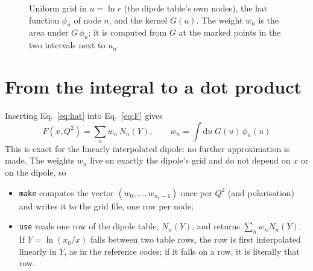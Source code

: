 \documentclass[11pt,a4paper]{article}
\newcommand{\dd}{\mathrm{d}}
\newcommand{\code}[1]{\texttt{\small #1}}
\begin{document}
\begin{figure}[H]
\centering
{}
\caption{Uniform grid in $u=\ln r$ (the dipole table's own nodes), the hat function $\phi_n$ of node $n$, and the kernel $G(u)$. The weight $w_n$ is the area under $G\,\phi_n$; it is computed from $G$ at the marked points in the two intervals next to $u_n$.}
\label{fig:hat}
\end{figure}

\section{From the integral to a dot product}
Inserting Eq.~\eqref{eq:hat} into Eq.~\eqref{eq:F} gives
\begin{equation}
\label{eq:dot}
\boxed{F(x,Q^2)=\sum_n w_n\,N_n(Y),\qquad w_n=\int\dd u\;G(u)\,\phi_n(u)}
\end{equation}
This is exact for the linearly interpolated dipole: no further approximation is made. The weights $w_n$ live on exactly the dipole's grid and do not depend on $x$ or on the dipole, so
\begin{itemize}
\item \code{make} computes the vector $(w_0,\dots,w_{n_r-1})$ once per $Q^2$ (and polarisation) and writes it to the grid file, one row per node;
\item \code{use} reads one row of the dipole table, $N_n(Y)$, and returns $\sum_n w_nN_n(Y)$. If $Y=\ln(x_0/x)$ falls between two table rows, the row is first interpolated linearly in $Y$, as in the reference codes; if it falls on a row, it is literally that row.
\end{itemize}
\end{document}
